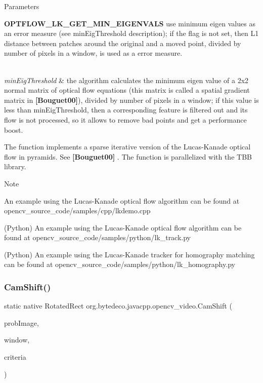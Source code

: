 \begin{DoxyParams}{Parameters}
\begin{DoxyItemize}
\item {\bfseries O\+P\+T\+F\+L\+O\+W\+\_\+\+L\+K\+\_\+\+G\+E\+T\+\_\+\+M\+I\+N\+\_\+\+E\+I\+G\+E\+N\+V\+A\+LS} use minimum eigen values as an error measure (see min\+Eig\+Threshold description); if the flag is not set, then L1 distance between patches around the original and a moved point, divided by number of pixels in a window, is used as a error measure. 
\end{DoxyItemize}\\
\hline
{\em min\+Eig\+Threshold} & the algorithm calculates the minimum eigen value of a 2x2 normal matrix of optical flow equations (this matrix is called a spatial gradient matrix in {\bfseries [Bouguet00]}), divided by number of pixels in a window; if this value is less than min\+Eig\+Threshold, then a corresponding feature is filtered out and its flow is not processed, so it allows to remove bad points and get a performance boost. \\
\hline
\end{DoxyParams}
The function implements a sparse iterative version of the Lucas-\/\+Kanade optical flow in pyramids. See {\bfseries [Bouguet00]} . The function is parallelized with the T\+BB library. 

\begin{DoxyNote}{Note}

\end{DoxyNote}

\begin{DoxyItemize}
\item An example using the Lucas-\/\+Kanade optical flow algorithm can be found at opencv\+\_\+source\+\_\+code/samples/cpp/lkdemo.\+cpp
\item (Python) An example using the Lucas-\/\+Kanade optical flow algorithm can be found at opencv\+\_\+source\+\_\+code/samples/python/lk\+\_\+track.\+py
\item (Python) An example using the Lucas-\/\+Kanade tracker for homography matching can be found at opencv\+\_\+source\+\_\+code/samples/python/lk\+\_\+homography.\+py 
\end{DoxyItemize}\mbox{\label{group__video__track_ga813283f225d7c4ce103da8b37981c69e}} 
\subsubsection{\texorpdfstring{Cam\+Shift()}{CamShift()}}
{\footnotesize\ttfamily static native Rotated\+Rect org.\+bytedeco.\+javacpp.\+opencv\+\_\+video.\+Cam\+Shift (\begin{DoxyParamCaption}\item[{@By\+Val Mat}]{prob\+Image,  }\item[{@By\+Ref Rect}]{window,  }\item[{@By\+Val Term\+Criteria}]{criteria }\end{DoxyParamCaption})\hspace{0.3cm}{\ttfamily [static]}}



